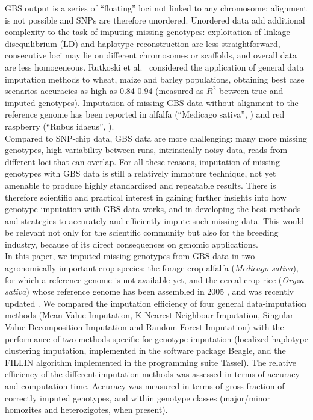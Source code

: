 GBS output is a series of ``floating'' loci not linked to any chromosome:
alignment is not possible and SNPs are therefore unordered. Unordered 
data add additional complexity to the task of imputing missing genotypes: 
exploitation of linkage disequilibrium (LD) and haplotype reconstruction 
are less straightforward, consecutive loci may lie on different chromosomes
or scaffolds, and overall data are less homogeneous. Rutkoski et al.~\cite{rutkoski_imputation_2013}
considered the application of general data imputation methods 
to wheat, maize and barley populations, obtaining best case scenarios accuracies 
as high as 0.84-0.94 (measured as $R^{2}$ between true and imputed genotypes). Imputation of missing GBS data without alignment to the reference genome has been reported in alfalfa (``Medicago sativa'', \cite{Rocher_validation_2015}) and red raspberry (``Rubus idaeus'', \cite{ward_saturated_2013}).\\
Compared to SNP-chip data, GBS data are more challenging: many more 
missing genotypes, high variability between runs, intrinsically noisy data, 
reads from different loci that can overlap. For all these reasons, imputation 
of missing genotypes with GBS data is still a relatively immature technique, 
not yet amenable to produce highly standardised and repeatable results. 
There is therefore scientific and practical interest in gaining further 
insights into how genotype imputation with GBS data works, and in 
developing the best methods and strategies to accurately and efficiently 
impute such missing data. This would be relevant not only for the scientific 
community but also for the breeding industry, because of its direct 
consequences on genomic applications.\\
In this paper, we imputed missing genotypes from GBS data in two agronomically
important crop species: the forage crop alfalfa (\emph{Medicago sativa}), for 
which a reference genome is not available yet, and the 
cereal crop rice (\emph{Oryza sativa}) whose reference genome has been 
assembled in 2005 \cite{international_rice_genome_sequencing_project_map-based_2005}, and
was recently updated \cite{kawahara_improvement_2013}. We compared the imputation 
efficiency of four general data-imputation methods (Mean Value Imputation, 
K-Nearest Neighbour Imputation, Singular Value Decomposition Imputation 
and Random Forest Imputation) with the performance of two methods specific 
for genotype imputation (localized haplotype clustering imputation, 
implemented in the software package Beagle, %
and the FILLIN algorithm implemented in the programming suite Tassel). The relative efficiency of 
the different imputation methods was assessed in terms of  
accuracy and computation time. Accuracy was measured in terms
of gross fraction of correctly imputed genotypes, and within
genotype classes (major/minor homozites and heterozigotes, when present).

